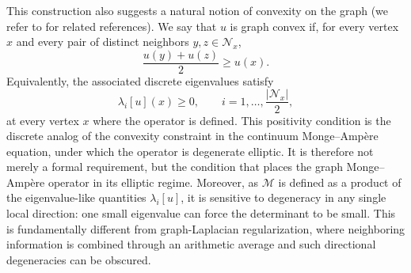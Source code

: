 \documentclass[reqno,11pt]{amsart}
\numberwithin{equation}{section}
\theoremstyle{definition}
\theoremstyle{remark}
\begin{document}
This construction also suggests a natural notion of convexity on the graph (we refer to \cite{convexT,convexTT, DelPezzoMosqueraRossi2014} for related references). We say that \(u\) is graph convex if, for every vertex \(x\) and every pair of distinct neighbors \(y,z\in \mathcal N_x\),
\[
    \frac{u(y)+u(z)}{2}\geq u(x).
\]
Equivalently, the associated discrete eigenvalues satisfy
\[
    \lambda_i[u](x)\geq 0,
    \qquad i=1,\dots,\frac{|\mathcal N_x|}{2},
\]
at every vertex \(x\) where the operator is defined. This positivity condition is the discrete analog of the convexity constraint in the continuum Monge--Amp\`ere equation, under which the operator is degenerate elliptic. It is therefore not merely a formal requirement, but the condition that places the graph Monge--Amp\`ere operator in its elliptic regime. Moreover, as \(\mathcal M\) is defined as a product of the eigenvalue-like quantities \(\lambda_i[u]\), it is sensitive to degeneracy in any single local direction: one small eigenvalue can force the determinant to be small. This is fundamentally different from graph-Laplacian regularization, where neighboring information is combined through an arithmetic average and such directional degeneracies can be obscured.
\end{document}

